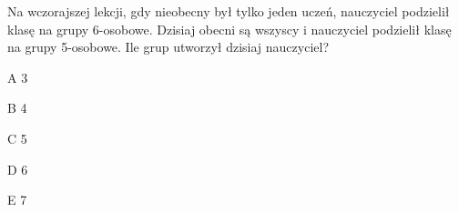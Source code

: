 \begin{tresc}
Na wczorajszej lekcji, gdy nieobecny był tylko jeden uczeń, nauczyciel podzielił klasę na grupy 6-osobowe. Dzisiaj obecni są wszyscy i nauczyciel podzielił klasę na grupy 5-osobowe. Ile grup utworzył dzisiaj nauczyciel?
\end{tresc}
\begin{wariant}{A} 3 \end{wariant}
\begin{wariant}{B} 4 \end{wariant}
\begin{wariant}{C} 5 \end{wariant}
\begin{wariant}{D} 6 \end{wariant}
\begin{wariant}{E} 7 \end{wariant}
